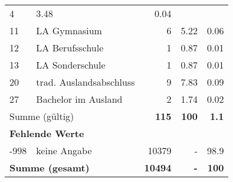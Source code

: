 \begin{longtable}{lXrrr}
       \num{4} &
       \num[round-mode=places,round-precision=2]{3.48} &
         \num[round-mode=places,round-precision=2]{0.04} \\

     11 &
     \multicolumn{1}{X}{ LA Gymnasium   } &


       \num{6} &
       \num[round-mode=places,round-precision=2]{5.22} &
         \num[round-mode=places,round-precision=2]{0.06} \\

     12 &
     \multicolumn{1}{X}{ LA Berufsschule   } &


       \num{1} &
       \num[round-mode=places,round-precision=2]{0.87} &
         \num[round-mode=places,round-precision=2]{0.01} \\

     13 &
     \multicolumn{1}{X}{ LA Sonderschule   } &


       \num{1} &
       \num[round-mode=places,round-precision=2]{0.87} &
         \num[round-mode=places,round-precision=2]{0.01} \\

     20 &
     \multicolumn{1}{X}{ trad. Auslandsabschluss   } &


       \num{9} &
       \num[round-mode=places,round-precision=2]{7.83} &
         \num[round-mode=places,round-precision=2]{0.09} \\

     27 &
     \multicolumn{1}{X}{ Bachelor im Ausland   } &


       \num{2} &
       \num[round-mode=places,round-precision=2]{1.74} &
         \num[round-mode=places,round-precision=2]{0.02} \\
     \midrule
     \multicolumn{2}{l}{Summe (gültig)} &
       \textbf{\num{115}} &
     \textbf{\num{100}} &
       \textbf{\num[round-mode=places,round-precision=2]{1.1}} \\
     \multicolumn{5}{l}{\textbf{Fehlende Werte}}\\
       -998 &
       keine Angabe &
         \num{10379} &
        - &
         \num[round-mode=places,round-precision=2]{98.9} \\
     \midrule
     \multicolumn{2}{l}{\textbf{Summe (gesamt)}} &
          \textbf{\num{10494}} &
        \textbf{-} &
        \textbf{\num{100}} \\
     \bottomrule
     \end{longtable}
     
